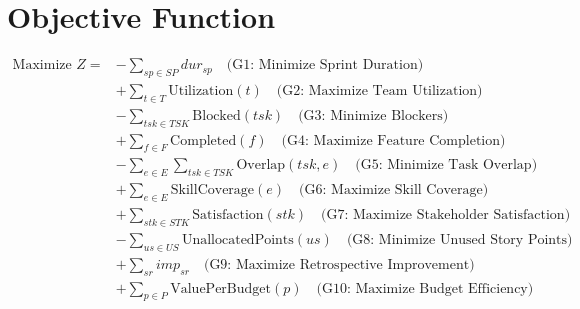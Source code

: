 \documentclass{article}
\begin{document}
\section*{Objective Function}
\begin{align*}
\text{Maximize } Z = & - \sum_{sp \in SP} dur_{sp} \quad \text{(G1: Minimize Sprint Duration)} \\
& + \sum_{t \in T} \text{Utilization}(t) \quad \text{(G2: Maximize Team Utilization)} \\
& - \sum_{tsk \in TSK} \text{Blocked}(tsk) \quad \text{(G3: Minimize Blockers)} \\
& + \sum_{f \in F} \text{Completed}(f) \quad \text{(G4: Maximize Feature Completion)} \\
& - \sum_{e \in E} \sum_{tsk \in TSK} \text{Overlap}(tsk,e) \quad \text{(G5: Minimize Task Overlap)} \\
& + \sum_{e \in E} \text{SkillCoverage}(e) \quad \text{(G6: Maximize Skill Coverage)} \\
& + \sum_{stk \in STK} \text{Satisfaction}(stk) \quad \text{(G7: Maximize Stakeholder Satisfaction)} \\
& - \sum_{us \in US} \text{UnallocatedPoints}(us) \quad \text{(G8: Minimize Unused Story Points)} \\
& + \sum_{sr} imp_{sr} \quad \text{(G9: Maximize Retrospective Improvement)} \\
& + \sum_{p \in P} \text{ValuePerBudget}(p) \quad \text{(G10: Maximize Budget Efficiency)}
\end{align*}
\end{document}
